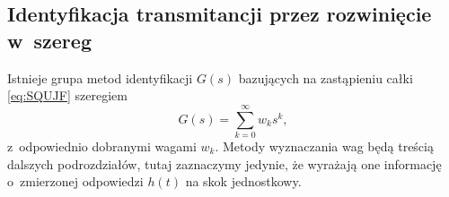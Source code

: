 \documentclass[paper=a4,DIV=12]{lpas}
\begin{document}
\begin{appendices}
  \subsection{Identyfikacja transmitancji przez rozwinięcie w~szereg}
  \label{eq:9XWOO}

  Istnieje grupa metod identyfikacji $G(s)$ bazujących na zastąpieniu całki
  \eqref{eq:SQUJF} szeregiem
  \begin{equation}
    G(s) = \sum_{k=0}^{\infty} w_k s^k,
    \label{eq:2PAK7}
  \end{equation}
  z~odpowiednio dobranymi wagami $w_k$. Metody wyznaczania wag będą treścią
  dalszych podrozdziałów, tutaj zaznaczymy jedynie, że wyrażają one informację
  o~zmierzonej odpowiedzi $h(t)$ na skok jednostkowy.


\end{appendices}
\end{document}
